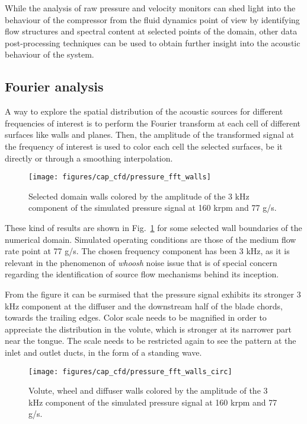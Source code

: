 While the analysis of raw pressure and velocity monitors can shed light into the behaviour of the compressor from the fluid dynamics point of view by identifying flow structures and spectral content at selected points of the domain, other data post-processing techniques can be used to obtain further insight into the acoustic behaviour of the system.   

\subsection{Fourier analysis}

A way to explore the spatial distribution of the acoustic sources for different frequencies of interest is to perform the Fourier transform at each cell of different surfaces like walls and planes. Then, the amplitude of the transformed signal at the frequency of interest is used to color each cell the selected surfaces, be it directly or through a smoothing interpolation.

\begin{figure}[htb!]
\hspace{-0.01\textwidth}
\texttt{[image: figures/cap\_cfd/pressure\_fft\_walls]}
\caption[Selected domain walls colored by 3 kHz amplitude]{Selected domain walls colored by the amplitude of the 3 kHz component of the simulated pressure signal at 160 krpm and 77 g/s.}
\label{fig:pressure_fft_walls}
\end{figure}

These kind of results are shown in Fig.~\ref{fig:pressure_fft_walls} for some selected wall boundaries of the numerical domain. Simulated operating conditions are those of the medium flow rate point at 77 g/s. The chosen frequency component has been 3 kHz, as it is relevant in the phenomenon of \emph{whoosh} noise issue that is of special concern regarding the identification of source flow mechanisms behind its inception.

From the figure it can be surmised that the pressure signal exhibits its stronger 3 kHz component at the diffuser and the downstream half of the blade chords, towards the trailing edges. Color scale needs to be magnified in order to appreciate the distribution in the volute, which is stronger at its narrower part near the tongue. The scale needs to be restricted again to see the pattern at the inlet and outlet ducts, in the form of a standing wave.

\begin{figure}[h!]
\centering
\texttt{[image: figures/cap\_cfd/pressure\_fft\_walls\_circ]}
\caption[Volute, wheel and diffuser colored by 3 kHz amplitude]{Volute, wheel and diffuser walls colored by the amplitude of the 3 kHz component of the simulated pressure signal at 160 krpm and 77 g/s.}
\label{fig:pressure_fft_walls_circ}
\end{figure}

